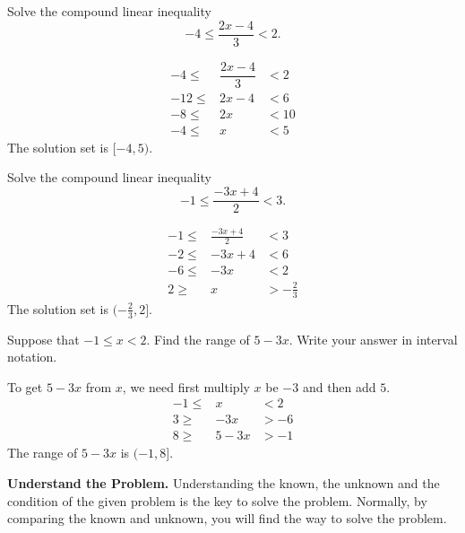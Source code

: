 \documentclass[en,11pt]{latex/elegantbookr}
\theoremstyle{definition}
\theoremstyle{definition}
\theoremstyle{definition}
\theoremstyle{remark}
\let\BeginKnitrBlock\begin \let\EndKnitrBlock\end
\begin{document}
\BeginKnitrBlock{example}
\protect\hypertarget{exm:unnamed-chunk-14}{}{\label{exm:unnamed-chunk-14} }Solve the compound linear inequality
\[
-4\leq\dfrac{2x-4}{3}<2.
\]
\EndKnitrBlock{example}

\BeginKnitrBlock{solution}
{}\[
\begin{array}{rcl}
    -4\leq  & \dfrac{2x-4}{3}    & <2  \\
    -12\leq & 2x-4         & <6  \\
    -8\leq  & 2x                & <10 \\
    -4\leq  & x               & <5  
\end{array}
\]
The solution set is \([-4, 5)\).
\EndKnitrBlock{solution}

\BeginKnitrBlock{example}
\protect\hypertarget{exm:unnamed-chunk-16}{}{\label{exm:unnamed-chunk-16} }Solve the compound linear inequality
\[
-1\leq \dfrac{-3x+4}{2}<3.
\]
\EndKnitrBlock{example}

\BeginKnitrBlock{solution}
{}\[
\begin{array}{rcl}
    -1\leq & \frac{-3x+4}{2}  & <3        \\
    -2\leq & -3x+4          & <6        \\
    -6\leq & -3x           & <2        \\
    2\geq  & x            & >-\frac23
\end{array}
\]
The solution set is \((-\frac23, 2]\).
\EndKnitrBlock{solution}

\BeginKnitrBlock{example}
\protect\hypertarget{exm:unnamed-chunk-18}{}{\label{exm:unnamed-chunk-18} }Suppose that \(-1\le x < 2\). Find the range of \(5-3x\). Write your answer in interval notation.
\EndKnitrBlock{example}

\BeginKnitrBlock{solution}
{}To get \(5-3x\) from \(x\), we need first multiply \(x\) be \(-3\) and then add \(5\).
\[
\begin{array}{rcl}
-1\leq & x          & < 2        \\
3\geq & -3x         & >-6        \\
8\geq & 5-3x      & >-1
\end{array}
\]
The range of \(5-3x\) is \((-1, 8]\).
\EndKnitrBlock{solution}

\BeginKnitrBlock{rmdtip}
\textbf{Understand the Problem.} Understanding the known, the unknown and the condition of the given problem is the key to solve the problem. Normally, by comparing the known and unknown, you will find the way to solve the problem.
\EndKnitrBlock{rmdtip}
\end{document}
